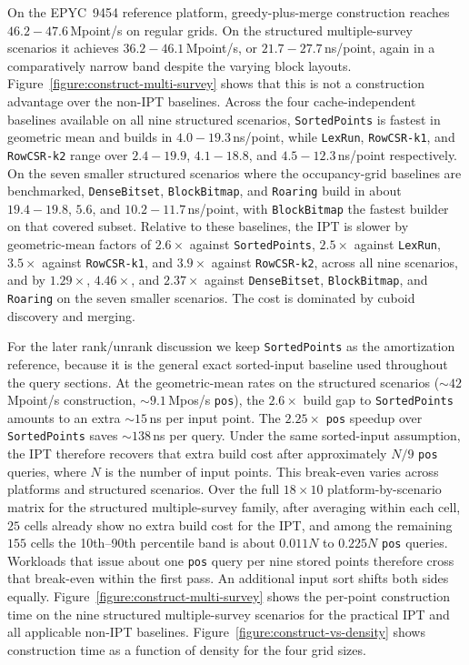 \documentclass[manuscript,screen,review]{acmart}
\theoremstyle{definition}
\theoremstyle{plain}
\begin{document}
On the EPYC~9454 reference platform, greedy-plus-merge construction
reaches $46.2{-}47.6$\,Mpoint/s on regular grids.
On the structured multiple-survey scenarios it achieves
$36.2{-}46.1$\,Mpoint/s, or $21.7{-}27.7$\,ns/point, again in a
comparatively narrow band despite the varying block layouts.
Figure~\ref{figure:construct-multi-survey} shows that this is not a
construction advantage over the non-IPT baselines. Across the four
cache-independent baselines available on all nine structured scenarios,
\texttt{SortedPoints} is fastest in geometric mean and builds in
$4.0{-}19.3$\,ns/point, while \texttt{LexRun}, \texttt{RowCSR-k1}, and
\texttt{RowCSR-k2} range over $2.4{-}19.9$, $4.1{-}18.8$, and
$4.5{-}12.3$\,ns/point respectively. On the seven smaller structured
scenarios where the occupancy-grid baselines are benchmarked,
\texttt{DenseBitset}, \texttt{BlockBitmap}, and \texttt{Roaring} build
in about $19.4{-}19.8$, $5.6$, and $10.2{-}11.7$\,ns/point, with
\texttt{BlockBitmap} the fastest builder on that covered subset.
Relative to these baselines, the IPT is slower by geometric-mean
factors of $2.6\times$ against \texttt{SortedPoints}, $2.5\times$
against \texttt{LexRun}, $3.5\times$ against \texttt{RowCSR-k1}, and
$3.9\times$ against \texttt{RowCSR-k2}, across all nine scenarios,
and by $1.29\times$, $4.46\times$, and $2.37\times$ against
\texttt{DenseBitset}, \texttt{BlockBitmap}, and \texttt{Roaring} on the
seven smaller scenarios. The cost is dominated by cuboid discovery and
merging.

For the later rank/unrank discussion we keep \texttt{SortedPoints} as
the amortization reference, because it is the general exact sorted-input
baseline used throughout the query sections. At the geometric-mean
rates on the structured scenarios (${\sim}42$\,Mpoint/s construction,
${\sim}9.1$\,Mpos/s \texttt{pos}), the $2.6\times$ build gap to
\texttt{SortedPoints} amounts to an extra ${\sim}15$\,ns per input
point. The $2.25\times$ \texttt{pos} speedup over \texttt{SortedPoints}
saves ${\sim}138$\,ns per query. Under the same sorted-input
assumption, the IPT therefore recovers that extra build cost after
approximately $N/9$ \texttt{pos} queries, where $N$ is the number of
input points. This break-even varies across platforms and structured
scenarios. Over the full $18\times 10$ platform-by-scenario matrix for
the structured multiple-survey family, after averaging within each
cell, $25$ cells already show no extra build cost for the IPT, and
among the remaining $155$ cells the 10th--90th percentile band is about
$0.011N$ to $0.225N$ \texttt{pos} queries. Workloads that issue about
one \texttt{pos} query per nine stored points therefore cross that
break-even within the first pass. An additional input sort shifts both
sides equally. Figure~\ref{figure:construct-multi-survey} shows the
per-point construction time on the nine structured multiple-survey
scenarios for the practical IPT and all applicable non-IPT baselines.
Figure~\ref{figure:construct-vs-density} shows construction time
as a function of density for the four grid sizes.
\end{document}
